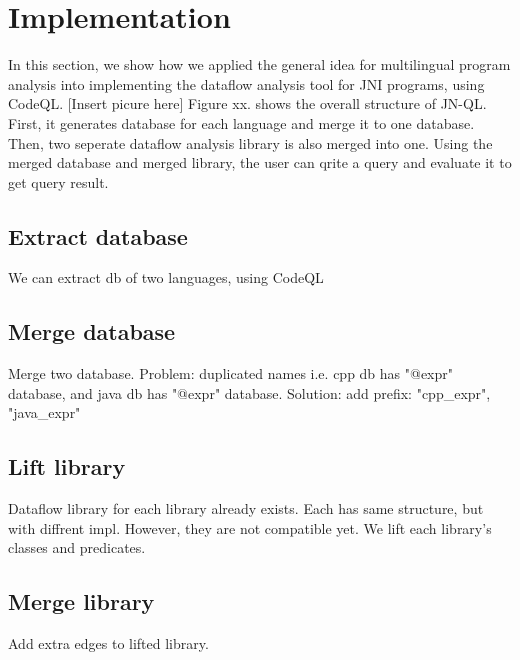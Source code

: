 \section{Implementation}
In this section, we show how we applied the general idea for multilingual program analysis
into implementing the dataflow analysis tool for JNI programs, using CodeQL.
[Insert picure here]
Figure xx. shows the overall structure of JN-QL. First, it generates database for each language
and merge it to one database. Then, two seperate dataflow analysis library is also
merged into one. Using the merged database and merged library, the user can
qrite a query and evaluate it to get query result.

\subsection{Extract database}
We can extract db of two languages, using CodeQL

\subsection{Merge database}
Merge two database.
Problem: duplicated names
i.e. cpp db has "@expr" database, and java db has "@expr" database.
Solution: add prefix: "cpp\_expr", "java\_expr"

\subsection{Lift library}
Dataflow library for each library already exists.
Each has same structure, but with diffrent impl.
However, they are not compatible yet.
We lift each library's classes and predicates.

\subsection{Merge library}
Add extra edges to lifted library.
